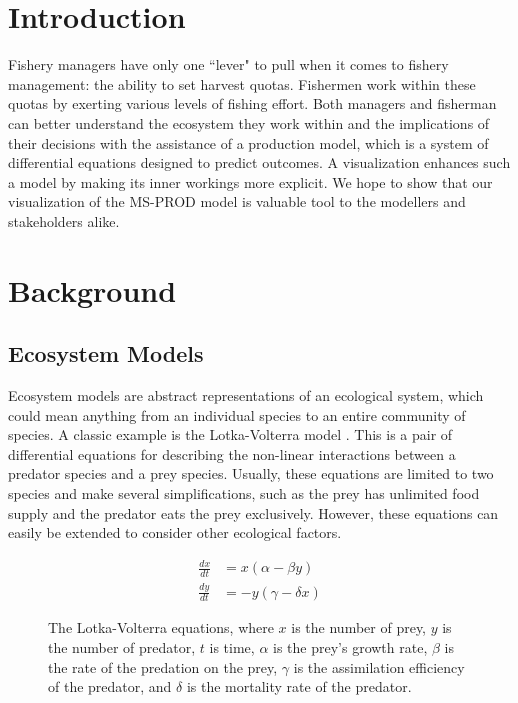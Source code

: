 \documentclass{article}
\begin{document}
\section{Introduction}

Fishery managers have only one ``lever" to pull when it comes to fishery management: the ability to set harvest quotas.  Fishermen work within these quotas by exerting various levels of fishing effort.  Both managers and fisherman can better understand the ecosystem they work within and the implications of their decisions with the assistance of a production model, which is a system of differential equations designed to predict outcomes.  A visualization enhances such a model by making its inner workings more explicit. We hope to show that our visualization of the MS-PROD model is valuable tool to the modellers and stakeholders alike. %

\section{Background}

\subsection{Ecosystem Models}

Ecosystem models are abstract representations of an ecological system, which could mean anything from an individual species to an entire community of species.  A classic example is the Lotka-Volterra model \cite{Lotka1926fds, VOL26a}.  This is a pair of differential equations for describing the non-linear interactions between a predator species and a prey species.  Usually, these equations are limited to two species and make several simplifications, such as the prey has unlimited food supply and the predator eats the prey exclusively.  However, these equations can easily be extended to consider other ecological factors.

\begin{figure}
\begin{align*}
\frac{dx}{dt} &= x(\alpha - \beta y) 
\\ \frac{dy}{dt} &= -y(\gamma - \delta x)
\end{align*}
\caption{The Lotka-Volterra equations, where $x$ is the number of prey, $y$ is the number of predator, $t$ is time, $\alpha$ is the prey's growth rate, $\beta$ is the rate of the predation on the prey, $\gamma$ is the assimilation efficiency of the predator, and $\delta$ is the mortality rate of the predator.}
\end{figure}
\end{document}
